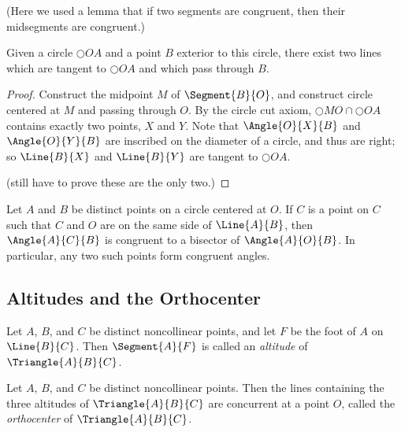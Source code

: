 (Here we used a lemma that if two segments are congruent, then their midsegments are congruent.)

\begin{construct}
Given a circle \(\Circle{O}{A}\) and a point \(B\) exterior to this circle, there exist two lines which are tangent to \(\Circle{O}{A}\) and which pass through \(B\).
\end{construct}

\begin{proof}
Construct the midpoint \(M\) of \(\Segment{B}{O}\), and construct circle centered at \(M\) and passing through \(O\). By the circle cut axiom, \(\Circle{M}{O} \cap \Circle{O}{A}\) contains exactly two points, \(X\) and \(Y\). Note that \(\Angle{O}{X}{B}\) and \(\Angle{O}{Y}{B}\) are inscribed on the diameter of a circle, and thus are right; so \(\Line{B}{X}\) and \(\Line{B}{Y}\) are tangent to \(\Circle{O}{A}\).

(still have to prove these are the only two.)
\end{proof}

\begin{prop}
Let \(A\) and \(B\) be distinct points on a circle centered at \(O\). If \(C\) is a point on \(C\) such that \(C\) and \(O\) are on the same side of \(\Line{A}{B}\), then \(\Angle{A}{C}{B}\) is congruent to a bisector of \(\Angle{A}{O}{B}\). In particular, any two such points form congruent angles.
\end{prop}

\subsection*{Altitudes and the Orthocenter}

\begin{dfn}
Let \(A\), \(B\), and \(C\) be distinct noncollinear points, and let \(F\) be the foot of \(A\) on \(\Line{B}{C}\). Then \(\Segment{A}{F}\) is called an \emph{altitude} of \(\Triangle{A}{B}{C}\). 
\end{dfn}

\begin{prop}
Let \(A\), \(B\), and \(C\) be distinct noncollinear points. Then the lines containing the three altitudes of \(\Triangle{A}{B}{C}\) are concurrent at a point \(O\), called the \emph{orthocenter} of \(\Triangle{A}{B}{C}\). 
\end{prop}
